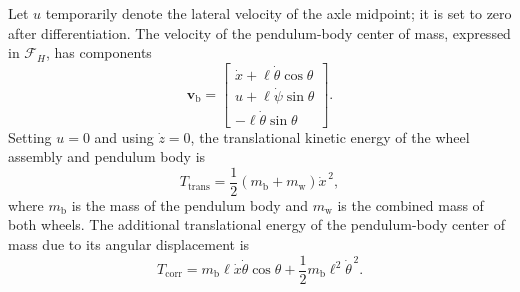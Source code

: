\documentclass[journal]{IEEEtran}
\begin{document}
Let $u$ temporarily denote the lateral velocity of the axle midpoint; it is
set to zero after differentiation. The velocity of the pendulum-body center
of mass, expressed in $\mathcal{F}_H$, has components
\begin{equation}
    \bm{v}_{\mathrm b}
    =
    \begin{bmatrix}
        \dot{x} + \ell\dot{\theta}\cos\theta \\
        u + \ell\dot{\psi}\sin\theta \\
        -\ell\dot{\theta}\sin\theta
    \end{bmatrix}.
    \label{eq:body_velocity}
\end{equation}
Setting $u=0$ and using $\dot z=0$, the translational kinetic energy of the
wheel assembly and pendulum body is
\begin{equation}
    T_{\mathrm{trans}}
    =
    \frac{1}{2}
    (m_{\mathrm b}+m_{\mathrm w})
    \dot{x}^{\,2},
    \label{eq:translational_kinetic_energy}
\end{equation}
where $m_{\mathrm b}$ is the mass of the pendulum body and $m_{\mathrm w}$ is
the combined mass of both wheels. The additional translational energy of the
pendulum-body center of mass due to its angular displacement is
\begin{equation}
    T_{\mathrm{corr}}
    =
    m_{\mathrm b}\ell
    \dot{x}\dot{\theta}\cos\theta
    +
    \frac{1}{2}
    m_{\mathrm b}\ell^2
    \dot{\theta}^{\,2}.
    \label{eq:correction_kinetic_energy}
\end{equation}
\end{document}
